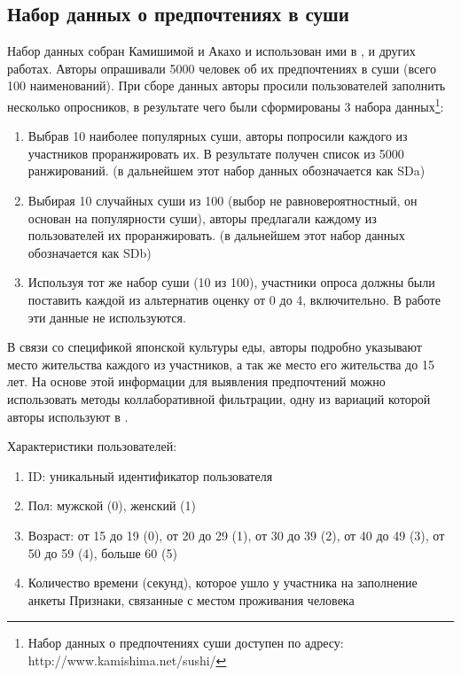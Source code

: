 	\subsection{Набор данных о предпочтениях в суши}
	\label{subsec:sushi_description}
		Набор данных собран Камишимой и Акахо и использован ими в \cite{Kamishima:2003}, \cite{Kamishima:2006} и других работах. Авторы опрашивали 5000 человек об их предпочтениях в суши (всего 100 наименований). При сборе данных авторы просили пользователей заполнить несколько опросников, в результате чего были сформированы 3 набора данных\footnote{Набор данных о предпочтениях суши доступен по адресу: http://www.kamishima.net/sushi/}:
		\begin{enumerate}[itemsep=-1.5mm]
			\item Выбрав 10 наиболее популярных суши, авторы попросили каждого из участников проранжировать их. В результате получен список из 5000 ранжирований. (в дальнейшем этот набор данных обозначается как SDa)
			\item Выбирая 10 случайных суши из 100 (выбор не равновероятностный, он основан на популярности суши), авторы предлагали каждому из пользователей их проранжировать. (в дальнейшем этот набор данных обозначается как SDb)
			\item Используя тот же набор суши (10 из 100), участники опроса должны были поставить каждой из альтернатив оценку от 0 до 4, включительно. В работе эти данные не используются.
		\end{enumerate}
		
		В связи со спецификой японской культуры еды, авторы подробно указывают место жительства каждого из участников, а так же место его жительства до 15 лет. На основе этой информации для выявления предпочтений можно использовать методы коллаборативной фильтрации\cite{Ricci:2011}, одну из вариаций которой авторы используют в \cite{Kamishima:2003}.
		
		\vspace{1em}
		
		\noindent Характеристики пользователей:
		\vspace{-0.7em}
		\begin{enumerate}[itemsep=-1.5mm]
			\item ID: уникальный идентификатор пользователя
			\item Пол: мужской (0), женский (1)
			\item Возраст: от 15 до 19 (0), от 20 до 29 (1), от 30 до 39 (2), от 40 до 49 (3), от 50 до 59 (4), больше 60 (5)
			\item Количество времени (секунд), которое ушло у участника на заполнение анкеты
			 Признаки, связанные с местом проживания человека
		\end{enumerate}
		
